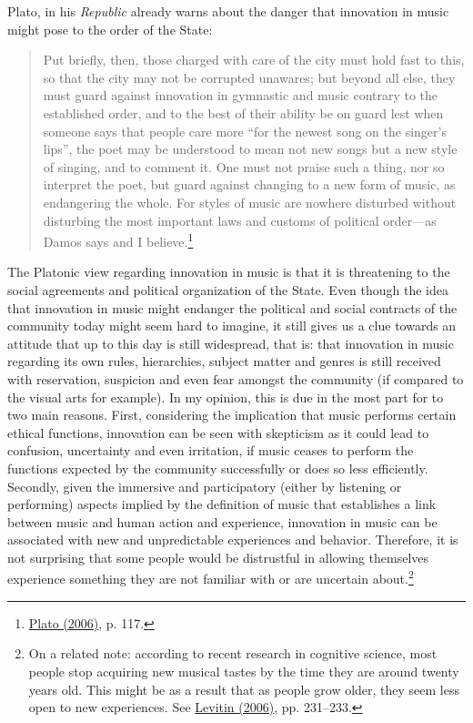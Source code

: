 Plato, in his \emph{Republic} already warns about the danger that innovation in music might pose to the order of the State:
\begin{quote}
Put briefly, then, those charged with care of the city must hold fast to this, so that the city may not be corrupted unawares; but beyond all else, they must guard against innovation in gymnastic and music contrary to the established order, and to the best of their ability be on guard lest when someone says that people care more ``for the newest song on the singer's lips'', the poet may be understood to mean not new songs but a new style of singing, and to comment it. One must not praise such a thing, nor so interpret the poet, but guard against changing to a new form of music, as endangering the whole. For styles of music are nowhere disturbed without disturbing the most important laws and customs of political order---as Damos says and I believe.\footnote{\hyperlink{plato}{Plato (2006)}, p. 117.}
\end{quote}
The Platonic view regarding innovation in music is that it is threatening to the social agreements and political organization of the State. Even though the idea that innovation in music might endanger the political and social contracts of the community today might seem hard to imagine, it still gives us a clue towards an attitude that up to this day is still widespread, that is: that innovation in music regarding its own rules, hierarchies, subject matter and genres is still received with reservation, suspicion and even fear amongst the community (if compared to the visual arts for example). In my opinion, this is due in the most part for to two main reasons. First, considering the implication that music performs certain ethical functions, innovation can be seen with skepticism as it could lead to confusion, uncertainty and even irritation, if music ceases to perform the functions expected by the community successfully or does so less efficiently. Secondly, given the immersive and participatory (either by listening or performing) aspects implied by the definition of music that establishes a link between music and human action and experience, innovation in music can be associated with new and unpredictable experiences and behavior. Therefore, it is not surprising that some people would be distrustful in allowing themselves experience something they are not familiar with or are uncertain about.\footnote{On a related note: according to recent research in cognitive science, most people stop acquiring new musical tastes by the time they are around twenty years old. This might be as a result that as people grow older, they seem less open to new experiences. See \hyperlink{musmind}{Levitin (2006)}, pp. 231--233.}

